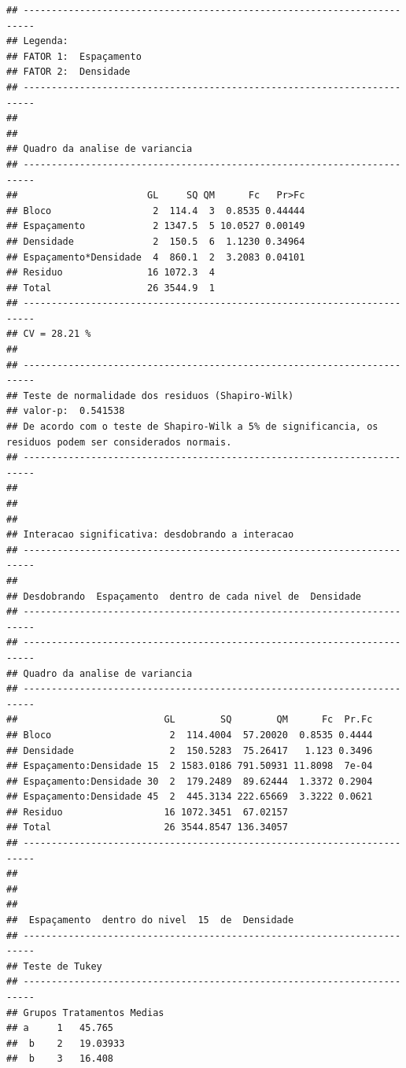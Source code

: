 \documentclass[
]{book}
\begin{document}
\begin{verbatim}
## ------------------------------------------------------------------------
## Legenda:
## FATOR 1:  Espaçamento 
## FATOR 2:  Densidade 
## ------------------------------------------------------------------------
## 
## 
## Quadro da analise de variancia
## ------------------------------------------------------------------------
##                       GL     SQ QM      Fc   Pr>Fc
## Bloco                  2  114.4  3  0.8535 0.44444
## Espaçamento            2 1347.5  5 10.0527 0.00149
## Densidade              2  150.5  6  1.1230 0.34964
## Espaçamento*Densidade  4  860.1  2  3.2083 0.04101
## Residuo               16 1072.3  4                
## Total                 26 3544.9  1                
## ------------------------------------------------------------------------
## CV = 28.21 %
## 
## ------------------------------------------------------------------------
## Teste de normalidade dos residuos (Shapiro-Wilk)
## valor-p:  0.541538 
## De acordo com o teste de Shapiro-Wilk a 5% de significancia, os residuos podem ser considerados normais.
## ------------------------------------------------------------------------
## 
## 
## 
## Interacao significativa: desdobrando a interacao
## ------------------------------------------------------------------------
## 
## Desdobrando  Espaçamento  dentro de cada nivel de  Densidade 
## ------------------------------------------------------------------------
## ------------------------------------------------------------------------
## Quadro da analise de variancia
## ------------------------------------------------------------------------
##                          GL        SQ        QM      Fc  Pr.Fc
## Bloco                     2  114.4004  57.20020  0.8535 0.4444
## Densidade                 2  150.5283  75.26417   1.123 0.3496
## Espaçamento:Densidade 15  2 1583.0186 791.50931 11.8098  7e-04
## Espaçamento:Densidade 30  2  179.2489  89.62444  1.3372 0.2904
## Espaçamento:Densidade 45  2  445.3134 222.65669  3.3222 0.0621
## Residuo                  16 1072.3451  67.02157               
## Total                    26 3544.8547 136.34057               
## ------------------------------------------------------------------------
## 
## 
## 
##  Espaçamento  dentro do nivel  15  de  Densidade 
## ------------------------------------------------------------------------
## Teste de Tukey
## ------------------------------------------------------------------------
## Grupos Tratamentos Medias
## a     1   45.765 
##  b    2   19.03933 
##  b    3   16.408 

\end{verbatim}
\end{document}
